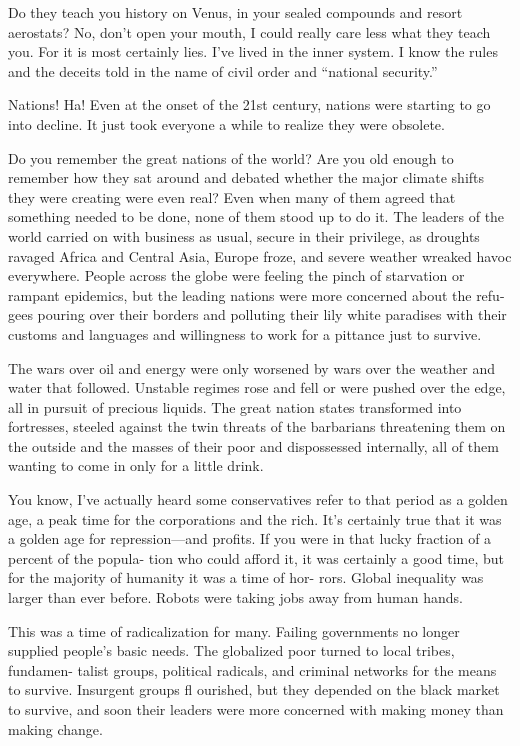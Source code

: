 Do they teach you history on Venus, in your sealed 
compounds and resort aerostats? No, don't open 
your mouth, I could really care less what they teach 
you. For it is most certainly lies. I've lived in the inner 
system. I know the rules and the deceits told in the 
name of civil order and ``national security.''

Nations! Ha! Even at the onset of the 21st century, 
nations were starting to go into decline. It just took 
everyone a while to realize they were obsolete.

Do you remember the great nations of the world? 
Are you old enough to remember how they sat around 
and debated whether the major climate shifts they 
were creating were even real? Even when many of 
them agreed that something needed to be done, none 
of them stood up to do it. The leaders of the world 
carried on with business as usual, secure in their 
privilege, as droughts ravaged Africa and Central 
Asia, Europe froze, and severe weather wreaked havoc 
everywhere. People across the globe were feeling the 
pinch of starvation or rampant epidemics, but the 
leading nations were more concerned about the refu-
gees pouring over their borders and polluting their lily 
white paradises with their customs and languages and 
willingness to work for a pittance just to survive.

The wars over oil and energy were only worsened 
by wars over the weather and water that followed. 
Unstable regimes rose and fell or were pushed over 
the edge, all in pursuit of precious liquids. The great 
nation states transformed into fortresses, steeled 
against the twin threats of the barbarians threatening 
them on the outside and the masses of their poor and 
dispossessed internally, all of them wanting to come 
in only for a little drink.

You know, I've actually heard some conservatives 
refer to that period as a golden age, a peak time for 
the corporations and the rich. It's certainly true that 
it was a golden age for repression—and profits. If you 
were in that lucky fraction of a percent of the popula-
tion who could afford it, it was certainly a good time, 
but for the majority of humanity it was a time of hor-
rors. Global inequality was larger than ever before. 
Robots were taking jobs away from human hands.

This was a time of radicalization for many. Failing 
governments no longer supplied people's basic needs. 
The globalized poor turned to local tribes, fundamen-
talist groups, political radicals, and criminal networks 
for the means to survive. Insurgent groups fl ourished, 
but they depended on the black market to survive, 
and soon their leaders were more concerned with 
making money than making change.


